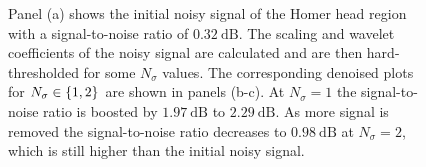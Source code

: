 \begin{figure}[htp]
	\centering
	\hfill
	\hfill
	\caption{
		Panel (a) shows the initial noisy signal of the Homer head region with a signal-to-noise ratio of \(\SI{0.32}{\dB}\).
		The scaling and wavelet coefficients of the noisy signal are calculated and are then hard-thresholded for some \(N_{\sigma}\) values.
		The corresponding denoised plots for \(N_{\sigma} \in \{1, 2\}\) are shown in panels (b-c).
		At \(N_{\sigma}=1\) the signal-to-noise ratio is boosted by \(\SI{1.97}{\dB}\) to \(\SI{2.29}{\dB}\).
		As more signal is removed the signal-to-noise ratio decreases to \(\SI{0.98}{\dB}\) at \(N_{\sigma}=2\), which is still higher than the initial noisy signal.
	}\label{fig:chapter4_denoising}
\end{figure}
